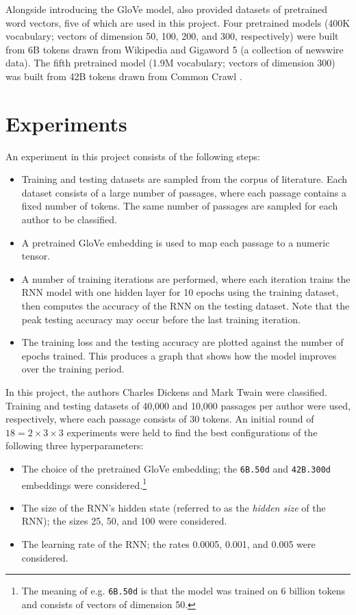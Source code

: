 \documentclass[12pt,letterpaper]{article}
\begin{document}
Alongside introducing the GloVe model, \cite{pennington2014GloVe} also provided datasets of pretrained word vectors, five of which are used in this project. Four pretrained models (400K vocabulary; vectors of dimension 50, 100, 200, and 300, respectively) were built from 6B tokens drawn from Wikipedia and Gigaword 5 (a collection of newswire data). The fifth pretrained model (1.9M vocabulary; vectors of dimension 300) was built from 42B tokens drawn from Common Crawl
\cite{commoncrawl}.

\section{Experiments}

An experiment in this project consists of the following steps:
\begin{itemize}
\item
Training and testing datasets are sampled from the corpus of literature. Each dataset consists of a large number of passages, where each passage contains a fixed number of tokens. The same number of passages are sampled for each author to be classified.

\item 
A pretrained GloVe embedding is used to map each passage to a numeric tensor.

\item 
A number of training iterations are performed, where each iteration trains the RNN model with one hidden layer for 10 epochs using the training dataset, then computes the accuracy of the RNN on the testing dataset. Note that the peak testing accuracy may occur before the last training iteration.

\item
The training loss and the testing accuracy are plotted against the number of epochs trained. This produces a graph that shows how the model improves over the training period. 
\end{itemize}


In this project, the authors Charles Dickens and Mark Twain were classified. Training and testing datasets of 40,000 and 10,000 passages per author were used, respectively, where each passage consists of 30 tokens.
An initial round of $18 = 2 \times 3 \times 3$ experiments were held to find the best configurations of the following three hyperparameters:

\begin{itemize}
    \item The choice of the pretrained GloVe embedding; the \texttt{6B.50d} and \texttt{42B.300d} embeddings were considered.\footnote{ The meaning of e.g. \texttt{6B.50d} is that the model was trained on 6 billion tokens and consists of vectors of dimension 50.}
    \item The size of the RNN's hidden state (referred to as the \emph{hidden size} of the RNN); the sizes 25, 50, and 100 were considered.
    \item The learning rate of the RNN; the rates 0.0005, 0.001, and 0.005 were considered.
\end{itemize}
\end{document}
